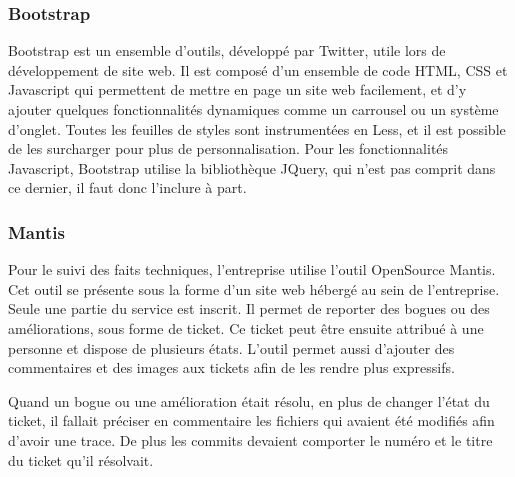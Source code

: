 \documentclass[12pt,a4paper]{article}
\begin{document}
\subsubsection{Bootstrap}
Bootstrap est un ensemble d'outils, développé par Twitter, utile lors de développement de site web. Il est composé d'un ensemble de code \gls{HTML}, \gls{CSS} et Javascript qui permettent de mettre en page un site web facilement, et d'y ajouter quelques fonctionnalités dynamiques comme un carrousel ou un système d'onglet. Toutes les feuilles de styles sont instrumentées en Less, et il est possible de les surcharger pour plus de personnalisation. Pour les fonctionnalités Javascript, Bootstrap utilise la bibliothèque JQuery, qui n'est pas comprit dans ce dernier, il faut donc l'inclure à part.

\subsubsection{Mantis}
Pour le suivi des faits techniques, l'entreprise utilise l'outil OpenSource Mantis. Cet outil se présente sous la forme d'un site web hébergé au sein de l'entreprise. Seule une partie du service est inscrit. Il permet de reporter des bogues ou des améliorations, sous forme de ticket. Ce ticket peut être ensuite attribué à une personne et dispose de plusieurs états. L'outil permet aussi d'ajouter des commentaires et des images aux tickets afin de les rendre plus expressifs.\par 
Quand un bogue ou une amélioration était résolu, en plus de changer l'état du ticket, il fallait préciser en commentaire les fichiers qui avaient été modifiés afin d'avoir une trace. De plus les commits devaient comporter le numéro et le titre du ticket qu'il résolvait.\par

\newpage
\end{document}
